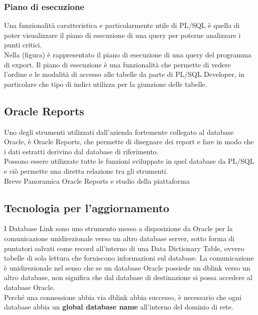 \subsubsection{Piano di esecuzione}
Una funzionalità caratteristica e particolarmente utile di PL/SQL è quella di poter visualizzare il piano di esecuzione di una query per poterne analizzare i punti critici.\\
Nella (figura) è rappresentato il piano di esecuzione di una query del programma di export. Il piano di esecuzione è una funzionalità che permette di vedere l'ordine e le modalità di accesso alle tabelle da parte di PL/SQL Developer, in particolare che tipo di indici utilizza per la giunzione delle tabelle.
\subsection{Oracle Reports}
Uno degli strumenti utilizzati dall'azienda fortemente collegato al database Oracle, è Oracle Reports, che permette di disegnare dei report e fare in modo che i dati estratti derivino dal database di riferimento.\\
Possono essere utilizzate tutte le funzioni sviluppate in quel database da PL/SQL e ciò permette una diretta relazione tra gli strumenti.\newline
[...]\\
 Breve Panoramica Oracle Reports e studio della piattaforma

\subsection{Tecnologia per l'aggiornamento}
I Database Link sono uno strumento messo a disposizione da Oracle per la comunicazione unidirezionale verso un altro database server, sotto forma di puntatori salvati come record all'interno di una Data Dictionary Table, ovvero tabelle di sola lettura che forniscono informazioni sul database. La comunicazione è unidirezionale nel senso che se un database Oracle possiede un dblink verso un altro database, non significa che dal database di destinazione si possa accedere al database Oracle.\\
Perché una connessione abbia via dblink abbia successo, è necessario che ogni database abbia un \textbf{global database name} all'interno del dominio di rete.\newline
[...]